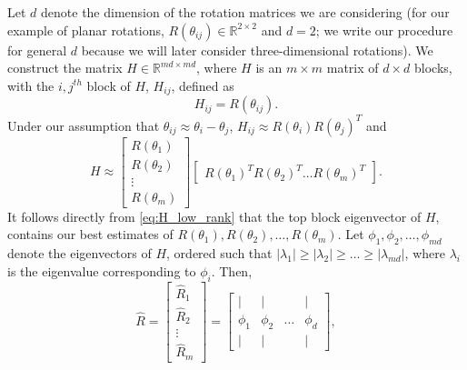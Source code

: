 \documentclass{pnastwo}
\begin{document}
\begin{article}
\begin{materials}
Let $d$ denote the dimension of the rotation matrices we are considering (for our example of planar rotations, $R(\theta_{ij}) \in \mathbb{R}^{2 \times 2}$ and $d=2$; we write our procedure for general $d$ because we will later consider three-dimensional rotations).
%
We construct the matrix $H \in \mathbb{R}^{md \times md}$, where $H$ is an $m \times m$ matrix of $d \times d$ blocks, with the $i,j^{th}$ block of $H$, $H_{ij}$, defined as
\begin{equation} \label{eq:H_to_R}
H_{ij} = R(\theta_{ij}).
\end{equation}
%
%
Under our assumption that $\theta_{ij} \approx \theta_i - \theta_j$, $H_{ij} \approx R(\theta_i) R(\theta_j)^T$
 and
\begin{equation} \label{eq:H_low_rank}
	H \approx
	\begin{bmatrix}
	R(\theta_1) \\
	R(\theta_2) \\
	\vdots \\
	R(\theta_m)
	\end{bmatrix}
	\begin{bmatrix}
	R(\theta_1)^T R(\theta_2)^T \dots R(\theta_m)^T
	\end{bmatrix}.
\end{equation}
%
It follows directly from \eqref{eq:H_low_rank}  that the top block eigenvector of $H$, %
contains our best estimates of $R(\theta_1), R(\theta_2), \dots, R(\theta_m)$.
%
Let $\phi_1, \phi_2, \dots, \phi_{md}$ denote the eigenvectors of $H$, ordered such that $|\lambda_1| \ge |\lambda_2| \ge \dots \ge |\lambda_{md}|$, where $\lambda_i$ is the eigenvalue corresponding to $\phi_i$.
%
Then,
\begin{equation}
\hat{R} =
\begin{bmatrix}
\hat{R}_1 \\
\hat{R}_2 \\
\vdots \\
\hat{R}_m
\end{bmatrix} =
\begin{bmatrix}
| & | & & | \\
\phi_1 & \phi_2 & \dots & \phi_d \\
| & | & & |
\end{bmatrix},
\end{equation}

\end{materials}
\end{article}
\end{document}
